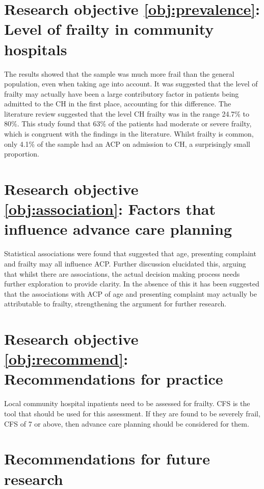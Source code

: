 \documentclass
[
	12pt,
	a4paper,
	oneside,
]{report}
\begin{document}
\section{Research objective \ref{obj:prevalence}: Level of frailty in
	community hospitals}

The results showed that the sample was much more frail than the general
population, even when taking age into account. It was suggested that the level
of frailty may actually have been a large contributory factor in patients
being admitted to the CH in the first place, accounting for this difference.
The literature review suggested that the level CH frailty was in the range 
24.7\% to 80\%. This study found that 63\% of the patients had moderate or
severe frailty, which is congruent with the findings in the literature. Whilst
frailty is common, only 4.1\% of the sample had an ACP on admission to CH, a
surprisingly small proportion.

\section{Research objective \ref{obj:association}: Factors that influence
advance care planning}

Statistical associations were found that suggested that age, presenting
complaint and frailty may all influence ACP. Further discussion elucidated
this, arguing that whilst there are associations, the actual decision
making process needs further exploration to provide clarity. In the absence of
this it has been suggested that the associations with ACP of age and 
presenting complaint may actually be attributable to frailty, strengthening
the argument for further research.

\section{Research objective \ref{obj:recommend}: Recommendations for practice}

Local community hospital inpatients need to be assessed for frailty. CFS is 
the tool that should be used for this assessment. If they are
found to be severely frail, CFS of 7 or above, then advance care planning
should be considered for them.

\section{Recommendations for future research}
\end{document}
